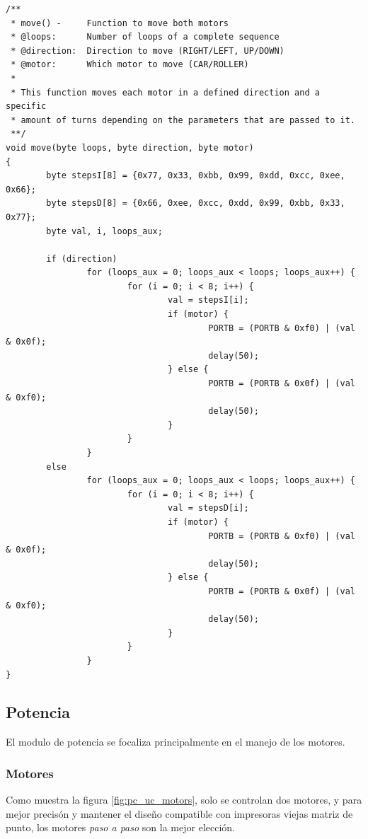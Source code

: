 \clearpage
\begin{lstlisting}
/**
 * move() -     Function to move both motors
 * @loops:      Number of loops of a complete sequence
 * @direction:  Direction to move (RIGHT/LEFT, UP/DOWN)
 * @motor:      Which motor to move (CAR/ROLLER) 
 *
 * This function moves each motor in a defined direction and a specific
 * amount of turns depending on the parameters that are passed to it.
 **/
void move(byte loops, byte direction, byte motor) 
{
        byte stepsI[8] = {0x77, 0x33, 0xbb, 0x99, 0xdd, 0xcc, 0xee, 0x66};
        byte stepsD[8] = {0x66, 0xee, 0xcc, 0xdd, 0x99, 0xbb, 0x33, 0x77}; 
        byte val, i, loops_aux;

        if (direction)
                for (loops_aux = 0; loops_aux < loops; loops_aux++) {
                        for (i = 0; i < 8; i++) {		
                                val = stepsI[i];
                                if (motor) {
                                        PORTB = (PORTB & 0xf0) | (val & 0x0f);
                                        delay(50);
                                } else {
                                        PORTB = (PORTB & 0x0f) | (val & 0xf0);
                                        delay(50);
                                }
                        }
                }
        else
                for (loops_aux = 0; loops_aux < loops; loops_aux++) {
                        for (i = 0; i < 8; i++) {		
                                val = stepsD[i];
                                if (motor) {
                                        PORTB = (PORTB & 0xf0) | (val & 0x0f);
                                        delay(50);
                                } else {
                                        PORTB = (PORTB & 0x0f) | (val & 0xf0);
                                        delay(50);
                                }
                        }
                }
}
\end{lstlisting}




\subsection{Potencia}
%
El modulo de potencia se focaliza principalmente en el manejo de los motores.

\subsubsection{Motores}\label{cap:motors_section}
%
Como muestra la figura \ref{fig:pc_uc_motors}, solo se controlan dos motores, y
para mejor precis\'on y mantener el dise\~no compatible con impresoras viejas
matriz de punto, los motores \emph{paso a paso} son la mejor elecci\'on.\\

